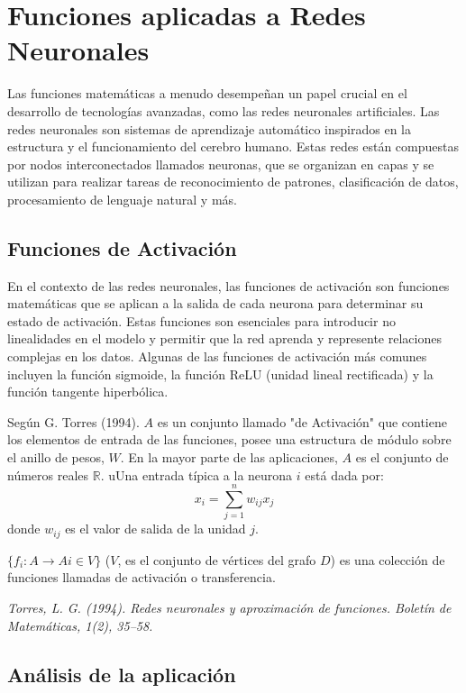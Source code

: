 \documentclass[11pt, a4paper]{article}
\begin{document}
  \newpage

  \section{Funciones aplicadas a Redes Neuronales}
  Las funciones matemáticas a menudo desempeñan un papel crucial en el desarrollo de tecnologías avanzadas, como las redes neuronales artificiales. Las redes neuronales son sistemas de aprendizaje automático inspirados en la estructura y el funcionamiento del cerebro humano. Estas redes están compuestas por nodos interconectados llamados neuronas, que se organizan en capas y se utilizan para realizar tareas de reconocimiento de patrones, clasificación de datos, procesamiento de lenguaje natural y más.
  \subsection{Funciones de Activación}
  En el contexto de las redes neuronales, las funciones de activación son funciones matemáticas que se aplican a la salida de cada neurona para determinar su estado de activación. Estas funciones son esenciales para introducir no linealidades en el modelo y permitir que la red aprenda y represente relaciones complejas en los datos. Algunas de las funciones de activación más comunes incluyen la función sigmoide, la función ReLU (unidad lineal rectificada) y la función tangente hiperbólica.

  Según G. Torres (1994). $A$ es un conjunto llamado "de Activación" que contiene los elementos de entrada de las funciones, posee una estructura de módulo sobre el anillo de pesos, $W$. En la mayor parte de las aplicaciones, $A$ es el conjunto de números reales $\mathbb{R}$. uUna entrada típica a la neurona $i$ está dada por:
  \[ x_i = \sum_{j=1}^{n} w_{ij}x_j \]
  donde $w_{ij}$ es el valor de salida de la unidad $j$.

  $\{f_i: A \rightarrow A i \in V\}$ ($V$, es el conjunto de vértices del grafo $D$) es una colección de funciones llamadas de activación o transferencia.

  \begin{flushright}
    \textit{Torres, L. G. (1994). Redes neuronales y aproximación de funciones. Boletín de Matemáticas, 1(2), 35–58.}
\end{flushright}

\subsection{Análisis de la aplicación}
\end{document}
